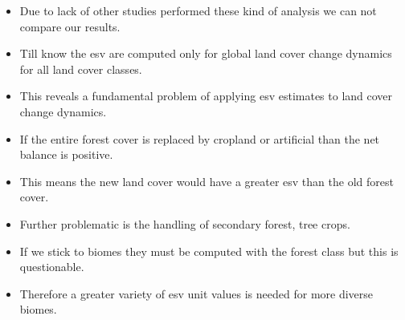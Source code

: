 \begin{itemize}
			\item Due to lack of other studies performed these kind of analysis we can not compare our results.
			\item Till know the esv are computed only for global land cover change dynamics for all land cover classes.
			\item This reveals a fundamental problem of applying esv estimates to land cover change dynamics.
			\item If the entire forest cover is replaced by cropland or artificial than the net balance is positive.
			\item This means the new land cover would have a greater esv than the old forest cover.
			\item Further problematic is the handling of secondary forest, tree crops.
			\item If we stick to biomes they must be computed with the forest class but this is questionable.
			\item Therefore a greater variety of esv unit values is needed for more diverse biomes. 
		\end{itemize}
